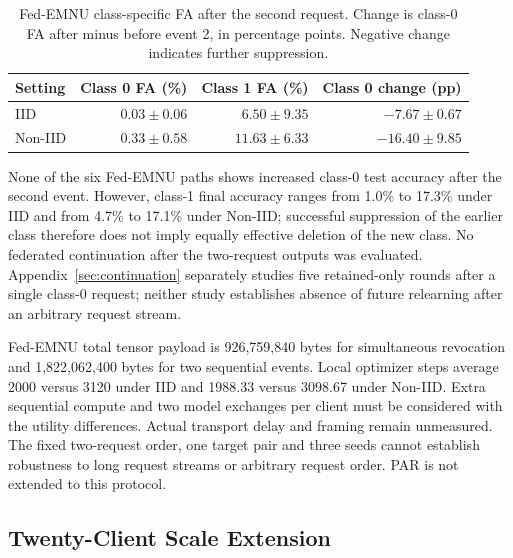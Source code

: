 \documentclass[software,article,submit,moreauthors]{Definitions/mdpi}
\begin{document}
\begin{table}[H]\centering\small

\caption{Fed-EMNU class-specific FA after the second request. Change is class-0 FA after minus before event 2, in percentage points. Negative change indicates further suppression.}

\label{tab:sequence-rebound}

\begin{tabular}{lrrr}\toprule Setting & Class 0 FA (\%) & Class 1 FA (\%) & Class 0 change (pp)\\\midrule

IID & $0.03 \pm 0.06$ & $6.50 \pm 9.35$ & $-7.67 \pm 0.67$\\

Non-IID & $0.33 \pm 0.58$ & $11.63 \pm 6.33$ & $-16.40 \pm 9.85$\\

\bottomrule\end{tabular}\end{table}

None of the six Fed-EMNU paths shows increased class-0 test accuracy after the second event. However, class-1 final accuracy ranges from 1.0\% to 17.3\% under IID and from 4.7\% to 17.1\% under Non-IID; successful suppression of the earlier class therefore does not imply equally effective deletion of the new class. No federated continuation after the two-request outputs was evaluated. Appendix~\ref{sec:continuation} separately studies five retained-only rounds after a single class-0 request; neither study establishes absence of future relearning after an arbitrary request stream.

Fed-EMNU total tensor payload is 926,759,840 bytes for simultaneous revocation and 1,822,062,400 bytes for two sequential events. Local optimizer steps average 2000 versus 3120 under IID and 1988.33 versus 3098.67 under Non-IID. Extra sequential compute and two model exchanges per client must be considered with the utility differences. Actual transport delay and framing remain unmeasured. The fixed two-request order, one target pair and three seeds cannot establish robustness to long request streams or arbitrary request order. PAR is not extended to this protocol.

\subsection{Twenty-Client Scale Extension}

\label{sec:clients20}
\end{document}

